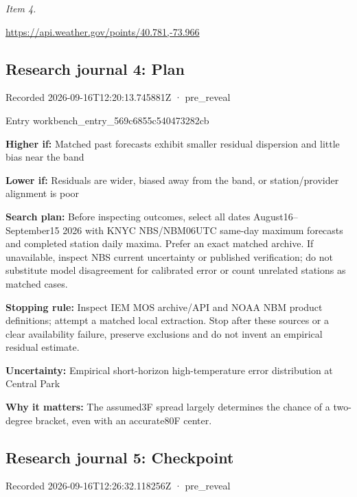 \documentclass[11pt]{article}
\begin{document}
\par\noindent\textit{Item 4.}\par \href{https://api.weather.gov/points/40.781,-73.966}{https://api.\hspace{0pt}weather.gov/\hspace{0pt}points/40.78\hspace{0pt}1,-73.966}

\subsection*{\textcolor{epdarkgreen}{Research journal 4: Plan}}
Recorded 2026-09-16T12:20:13.745881Z · pre\_reveal


Entry workbench\_en\hspace{0pt}try\_569c6855\hspace{0pt}c540473282cb


\par\noindent\textbf{Higher if:} Matched past forecasts exhibit smaller residual dispersion and little bias near the band

\par\noindent\textbf{Lower if:} Residuals are wider, biased away from the band, or station/provider alignment is poor

\par\noindent\textbf{Search plan:} Before inspecting outcomes, select all dates August16–September15 2026 with KNYC NBS/NBM06UTC same-day maximum forecasts and completed station daily maxima. Prefer an exact matched archive. If unavailable, inspect NBS current uncertainty or published verification; do not substitute model disagreement for calibrated error or count unrelated stations as matched cases.

\par\noindent\textbf{Stopping rule:} Inspect IEM MOS archive/API and NOAA NBM product definitions; attempt a matched local extraction. Stop after these sources or a clear availability failure, preserve exclusions and do not invent an empirical residual estimate.

\par\noindent\textbf{Uncertainty:} Empirical short-horizon high-temperature error distribution at Central Park

\par\noindent\textbf{Why it matters:} The assumed3F spread largely determines the chance of a two-degree bracket, even with an accurate80F center.

\subsection*{\textcolor{epdarkgreen}{Research journal 5: Checkpoint}}
Recorded 2026-09-16T12:26:32.118256Z · pre\_reveal
\end{document}
